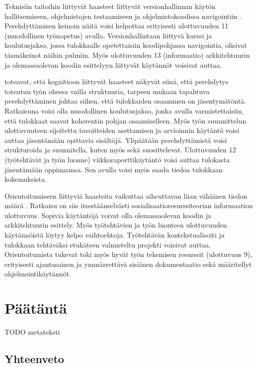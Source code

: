 \documentclass[utf8]{gradu3}
\begin{document}
Teknisiin taitoihin liittyvät haasteet liittyvät versionhallinnan käytön hallitsemiseen, ohjelmistojen testaamiseen ja ohjelmistokoodissa navigointiin \parencite{begel-simon-2008}. Perehdyttämisen keinoin näitä voisi helpottaa erityisesti ulottuvuuden 11 (muodollinen työnopetus) avulla. Versionhallintaan liittyvä kurssi ja koulutusjakso, jossa tulokkaalle opetettaisiin koodipohjassa navigointia, olisivat täsmäkeinot näihin pulmiin. Myös ulottuvuuden 13 (informaatio) arkkitehtuurin ja olemassaolevan koodin esittelyyn liittyvät käytännöt voisivat auttaa. 

\textcite{begel-simon-2008} toteavat, että kognitioon liittyvät haasteet näkyvät siinä, että perehdytys toteutuu työn ohessa vailla struktuuria, tarpeen mukaan tapahtuva perehdyttäminen johtaa siihen, että tulokkaiden osaaminen on jäsentymätöntä. Ratkaisuna voisi olla muodollinen koulutusjakso, jonka avulla varmistettaisiin, että tulokkaat saavat koherentin pohjan osaamiselleen. Myös työn suunnittelun ulottuvuuteen sijoitettu tavoitteiden asettamisen ja arvioinnin käytäntö voisi auttaa jäsentämään opittavia sisältöjä. Ylipäätään perehdyttämistä voisi strukturoida ja suunnitella, kuten myös \textcite{britto-ym-2020} sekä \textcite{hemphill-begel-2011} suosittelevat. Ulottuvuuden 12 (työtehtävät ja työn luonne) viikkoraporttikäytäntö voisi auttaa tulokasta jäsentämään oppimaansa. Sen avulla voisi myös saada tiedoa tulokkaan kokemuksista.

Orientoitumiseen liittyviä haasteita vaikuttaa aiheuttavan liian vähäinen tiedon määrä \parencite{begel-simon-2008}. Ratkaisu on siis itsestäänselvästi sosialisaatioresurssiteorian informaation ulottuvuus. Sopivia käytäntöjä voivat olla olemassaolevan koodin ja arkkitehtuurin esittely. Myös työtehtävien ja työn luonteen ulottuvuuden käytännöistä löytyy kelpo vaihtoehtoja. Työtehtävän kontekstualisoiti ja tulokkaan tehtäväksi etukäteen valmisteltu projekti voisivat auttaa. Orientoitumista tukevat toki myös hyvät työn tekemisen resurssit (ulottuvuus 9), erityisesti ajantasainen ja ymmärrettävä sisäinen dokumentaatio sekä määritellyt ohjelmointikäytännöt.

\chapter{Päätäntä}
\label{paaluku-paatanta}

TODO metateksti

\section{Yhteenveto}
\end{document}
